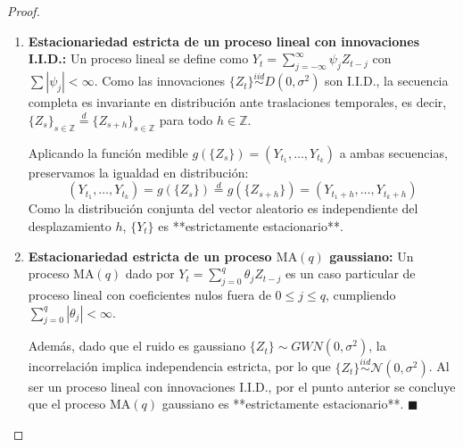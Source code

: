 \documentclass[11pt,letterpaper]{article}
\begin{document}
\begin{proof}
\begin{enumerate}
    \item \textbf{Estacionariedad estricta de un proceso lineal con innovaciones I.I.D.:}
    Un proceso lineal se define como $Y_t = \sum_{j=-\infty}^{\infty} \psi_j Z_{t-j}$ con $\sum |\psi_j| < \infty$. Como las innovaciones $\{Z_t\} \overset{iid}{\sim} D(0, \sigma^2)$ son I.I.D., la secuencia completa es invariante en distribución ante traslaciones temporales, es decir, $\{Z_s\}_{s\in\mathbb{Z}} \overset{d}{=} \{Z_{s+h}\}_{s\in\mathbb{Z}}$ para todo $h \in \mathbb{Z}$.
    
    Aplicando la función medible $g(\{Z_s\}) = (Y_{t_1}, \dots, Y_{t_k})$ a ambas secuencias, preservamos la igualdad en distribución:
    \[
    (Y_{t_1}, \dots, Y_{t_k}) = g(\{Z_s\}) \overset{d}{=} g(\{Z_{s+h}\}) = (Y_{t_1+h}, \dots, Y_{t_k+h})
    \]
    Como la distribución conjunta del vector aleatorio es independiente del desplazamiento $h$, $\{Y_t\}$ es **estrictamente estacionario**.

    \item \textbf{Estacionariedad estricta de un proceso $\text{MA}(q)$ gaussiano:}
    Un proceso $\text{MA}(q)$ dado por $Y_t = \sum_{j=0}^{q} \theta_j Z_{t-j}$ es un caso particular de proceso lineal con coeficientes nulos fuera de $0 \le j \le q$, cumpliendo $\sum_{j=0}^{q} |\theta_j| < \infty$.
    
    Además, dado que el ruido es gaussiano $\{Z_t\} \sim GWN(0, \sigma^2)$, la incorrelación implica independencia estricta, por lo que $\{Z_t\} \overset{iid}{\sim} \mathcal{N}(0,\sigma^2)$. Al ser un proceso lineal con innovaciones I.I.D., por el punto anterior se concluye que el proceso $\text{MA}(q)$ gaussiano es **estrictamente estacionario**. \quad $\blacksquare$
\end{enumerate}
\end{proof}
\end{document}
